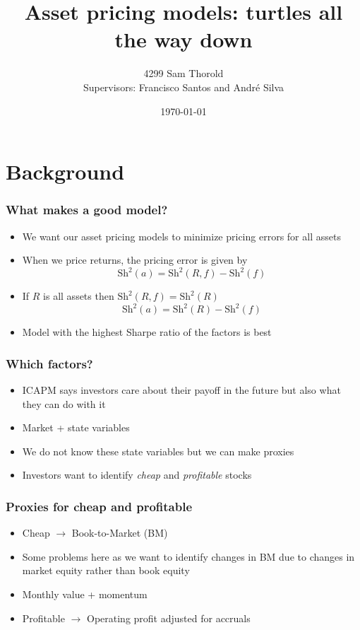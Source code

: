 \documentclass{beamer}
\title[Turtles]{Asset pricing models: turtles all the way down}
\author[Thorold]{4299 Sam Thorold\\
                 Supervisors: Francisco Santos and Andr\'e Silva}
\institute{NHH and NOVA}
\date[April 2018]{\today}
\begin{document}
\frame{\titlepage}

\section{Background}

\begin{frame}
\frametitle{What makes a good model?}
\begin{itemize}
    \item<1-> We want our asset pricing models to minimize pricing errors for
    all assets
    \item<1-> When we price returns, the pricing error is given by
    \[
    \text{Sh}^2(a) = \text{Sh}^2(R, f) - \text{Sh}^2(f)
    \]
    \item<2-> If $R$ is all assets then $\text{Sh}^2(R, f) = \text{Sh}^2(R)$
    \[
    \text{Sh}^2(a) = \text{Sh}^2(R) - \text{Sh}^2(f)
    \]
    \item<2->Model with the highest Sharpe ratio of the factors is best
\end{itemize}
\end{frame}

\begin{frame}
\frametitle{Which factors?}
\begin{itemize}
    \item<1-> ICAPM says investors care about their payoff in the future but
    also what they can do with it
    \item<1-> Market + state variables
    \item<1-> We do not know these state variables but we can make proxies
    \item<1-> Investors want to identify \emph{cheap} and \emph{profitable} stocks
\end{itemize}
\end{frame}

\begin{frame}
\frametitle{Proxies for cheap and profitable}
\begin{itemize}
    \item<1-> Cheap $\rightarrow$ Book-to-Market (BM)
    \item<1-> Some problems here as we want to identify changes in BM due to
    changes in market equity rather than book equity
    \item<1-> Monthly value + momentum
    \item<1-> Profitable $\rightarrow$ Operating profit adjusted for accruals
\end{itemize}
\end{frame}
\end{document}
